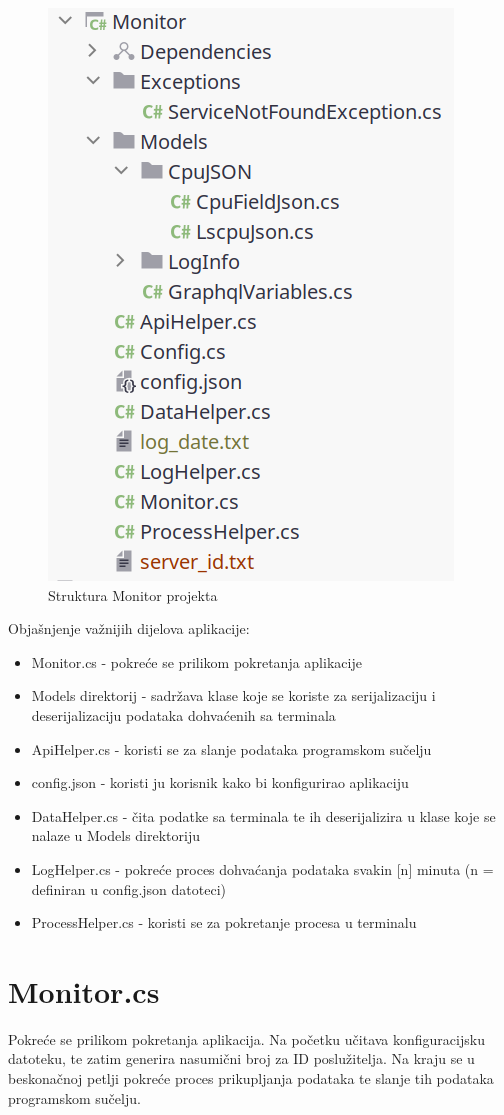 \documentclass[zavrsnirad]{fer}
\begin{document}
\begin{figure}[htb!]
	\centering
	\includegraphics[width=0.4\linewidth]{images/monitor_structure.png} 
	\caption{Struktura Monitor projekta}
	\label{slk:monitor_structure.png}
\end{figure}
\FloatBarrier

Objašnjenje važnijih dijelova aplikacije:
\begin{itemize}
	\item Monitor.cs - pokreće se prilikom pokretanja aplikacije
	\item Models direktorij - sadržava klase koje se koriste za serijalizaciju i deserijalizaciju podataka dohvaćenih sa terminala
	\item ApiHelper.cs - koristi se za slanje podataka programskom sučelju
	\item config.json - koristi ju korisnik kako bi konfigurirao aplikaciju
	\item DataHelper.cs - čita podatke sa terminala te ih deserijalizira u klase koje se nalaze u Models direktoriju
	\item LogHelper.cs - pokreće proces dohvaćanja podataka svakin [n] minuta (n = definiran u config.json datoteci)
	\item ProcessHelper.cs - koristi se za pokretanje procesa u terminalu
\end{itemize}

\section{Monitor.cs}
Pokreće se prilikom pokretanja aplikacija. Na početku učitava konfiguracijsku datoteku, te zatim generira nasumični broj za ID poslužitelja. Na kraju se u beskonačnoj petlji pokreće proces prikupljanja podataka te slanje tih podataka programskom sučelju.
\end{document}
